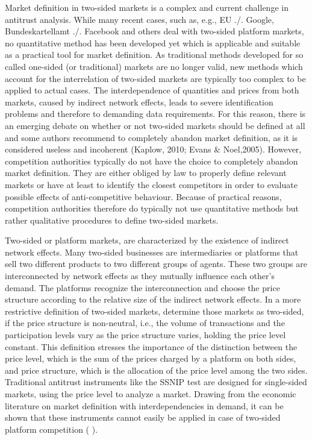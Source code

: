 \documentclass[12pt,a4paper,notitlepage]{article}
\begin{document}
Market definition in two-sided markets is a complex and current challenge in antitrust analysis. While many recent cases, such as, e.g., EU ./. Google, Bundeskartellamt ./. Facebook and others deal with two-sided platform markets, no quantitative method has been developed yet which is applicable and suitable as a practical tool for market definition. As traditional methods developed for so called one-sided (or traditional) markets are no longer valid, new methods which account for the interrelation of two-sided markets are typically too complex to be applied to actual cases. The interdependence of quantities and prices from both markets, caused by indirect network effects, leads to severe identification problems and therefore to demanding data requirements. For this reason, there is an emerging debate on whether or not two-sided markets should be defined at all and some authors recommend to completely abandon market definition, as it is considered useless and incoherent (Kaplow, 2010; Evans \& Noel,2005). However, competition authorities typically do not have the choice to completely abandon market definition. They are either obliged by law to properly define relevant markets or have at least to identify the closest competitors in order to evaluate possible effects of anti-competitive behaviour. Because of practical reasons, competition authorities therefore do typically not use quantitative methods but rather qualitative procedures to define two-sided markets.   

Two-sided or platform markets, are characterized by the existence of indirect network effects. Many two-sided businesses are intermediaries or platforms that sell two different products to two different groups of agents. These two groups are interconnected by network effects as they mutually influence each other’s demand. The platforms recognize the interconnection and choose the price structure according to the relative size of the indirect network effects. In a more restrictive definition of two-sided markets, \cite{rochet_platform_2003} determine those markets as two-sided, if the price structure is non-neutral, i.e., the volume of transactions and the participation levels vary as the price structure varies, holding the price level constant. This definition stresses the importance of the distinction between the price level, which is the sum of the prices charged by a platform on both sides, and price structure, which is the allocation of the price level among the two sides. Traditional antitrust instruments like the SSNIP test are designed for single-sided markets, using the price level to analyze a market. Drawing from the economic literature on market definition with interdependencies in demand, it can be shown that these instruments cannot easily be applied in case of two-sided platform competition (\cite{noel_analyzing_2005} \cite{filistrucchi_market_2013}).
\end{document}
